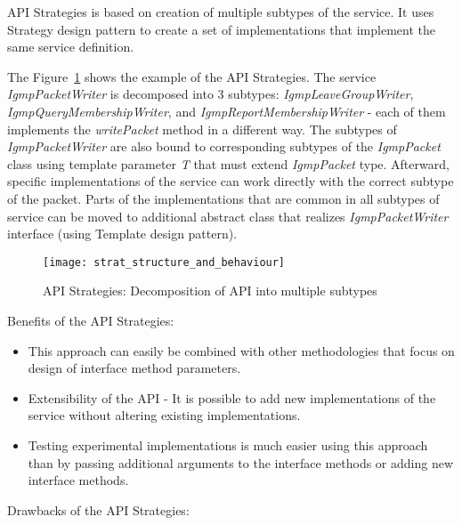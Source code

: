 API Strategies is based on creation of multiple subtypes of the service.
It uses Strategy design pattern to create a set of implementations that implement the same service definition\@.

The Figure~\ref{fig:strat_structure_and_behaviour} shows the example of the API Strategies.
The service \textit{IgmpPacketWriter} is decomposed into 3 subtypes: \textit{IgmpLeaveGroupWriter},
\textit{IgmpQueryMembershipWriter}, and \textit{IgmpReportMembershipWriter} - each of them implements
the \textit{writePacket} method in a different way.
The subtypes of \textit{IgmpPacketWriter} are also bound to corresponding subtypes of the \textit{IgmpPacket} class
using template parameter \textit{T} that must extend \textit{IgmpPacket} type.
Afterward, specific implementations of the service can work directly with the correct subtype of the packet.
Parts of the implementations that are common in all subtypes of service can be moved to additional abstract
class that realizes \textit{IgmpPacketWriter} interface (using Template design pattern).

\begin{figure}[!htb]
    \centering
    \texttt{[image: strat\_structure\_and\_behaviour]}
    \caption{API Strategies: Decomposition of API into multiple subtypes}
    \label{fig:strat_structure_and_behaviour}
\end{figure}

Benefits of the API Strategies:

\begin{itemize}
    \item This approach can easily be combined with other methodologies that focus on design of interface
    method parameters.
    \item Extensibility of the API - It is possible to add new implementations of the service
    without altering existing implementations.
    \item Testing experimental implementations is much easier using this approach than by passing additional arguments
    to the interface methods or adding new interface methods.
\end{itemize}

Drawbacks of the API Strategies:

